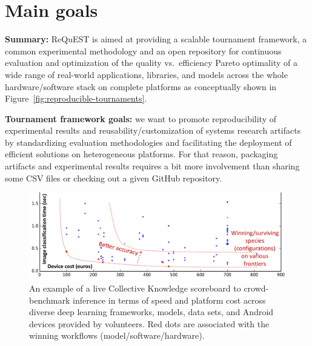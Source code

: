 \documentclass[10pt,letterpaper,twocolumn]{article}
\begin{document}
\section{Main goals}

\textbf{Summary:} ReQuEST is aimed at providing a scalable tournament framework, 
a common experimental methodology and an open repository for continuous evaluation 
and optimization of the quality vs.\ efficiency Pareto optimality of a wide range 
of real-world applications, libraries, and models across the whole 
hardware/software stack on complete platforms as conceptually shown 
in Figure~\ref{fig:reproducible-tournaments}.

\textbf{Tournament framework goals:} we want to promote reproducibility 
of experimental results and reusability/customization of systems research artifacts 
by standardizing evaluation methodologies and facilitating the deployment 
of efficient solutions on heterogeneous platforms. 
%
For that reason, packaging artifacts and experimental results requires a bit more
involvement than sharing some CSV files or checking out a given GitHub repository. 
%
   \begin{figure}[!htbp]
     \centering
      \includegraphics[width=5.2in]
      {ck-assets/32c0b60dcc114aa8-cropped.pdf} %
     \caption{
      An example of a live Collective Knowledge scoreboard to crowd-benchmark
      inference in terms of speed and platform cost 
      across diverse deep learning frameworks, models, data sets, and 
      Android devices provided by volunteers. Red dots 
      are associated with the winning workflows (model/software/hardware).
     }
     \vspace{-1em}
     \label{fig:dnn-crowdtuning-example}
   \end{figure}
\end{document}
